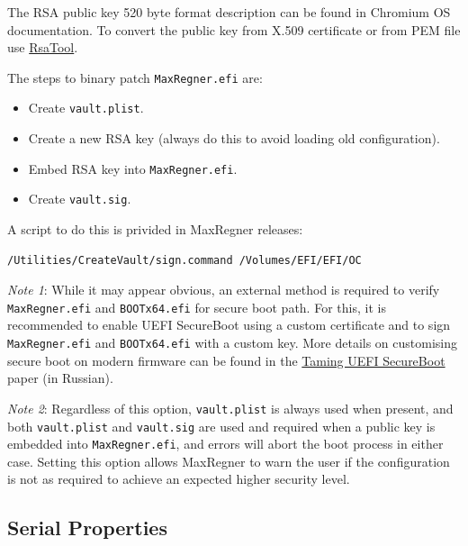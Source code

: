 \documentclass[]{article}
\providecommand{\tightlist}{%
  \setlength{\itemsep}{0pt}\setlength{\parskip}{0pt}}
\begin{document}
\begin{enumerate}
  The RSA public key 520 byte format description can be found in Chromium OS documentation.
  To convert the public key from X.509 certificate or from PEM file use
  \href{https://github.com/acidanthera/MaxRegnerPkg/tree/master/Utilities/CreateVault}{RsaTool}.


  The steps to binary patch \texttt{MaxRegner.efi} are:

  \begin{itemize}
  \tightlist
  \item Create \texttt{vault.plist}.
  \item Create a new RSA key (always do this to avoid loading old configuration).
  \item Embed RSA key into \texttt{MaxRegner.efi}.
  \item Create \texttt{vault.sig}.
  \end{itemize}

  A script to do this is privided in MaxRegner releases:
\begin{lstlisting}[label=createvault, style=ocbash]
/Utilities/CreateVault/sign.command /Volumes/EFI/EFI/OC
\end{lstlisting}

  \emph{Note 1}: While it may appear obvious, an external
  method is required to verify \texttt{MaxRegner.efi} and \texttt{BOOTx64.efi} for
  secure boot path. For this, it is recommended to enable UEFI SecureBoot
  using a custom certificate and to sign \texttt{MaxRegner.efi} and \texttt{BOOTx64.efi}
  with a custom key. More details on customising secure boot on modern firmware
  can be found in the \href{https://habr.com/post/273497/}{Taming UEFI SecureBoot}
  paper (in Russian).

  \emph{Note 2}:  Regardless of this option, \texttt{vault.plist} is always used when
  present, and both \texttt{vault.plist} and \texttt{vault.sig} are used and required
  when a public key is embedded into \texttt{MaxRegner.efi}, and errors will abort the
  boot process in either case. Setting this option allows MaxRegner to warn the user if
  the configuration is not as required to achieve an expected higher security level.

\end{enumerate}

\subsection{Serial Properties}\label{miscserialprops}
\end{document}
